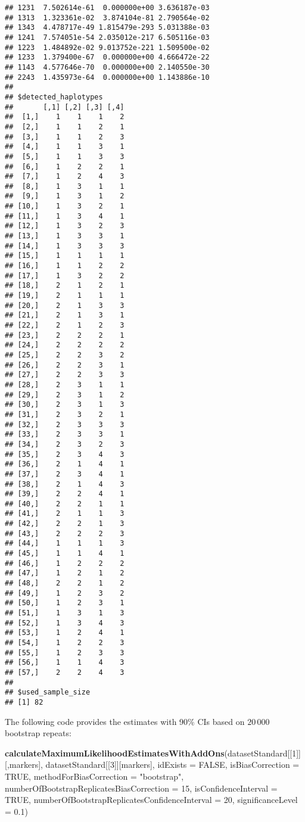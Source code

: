 \documentclass[
]{article}
\newenvironment{Shaded}{\begin{snugshade}}{\end{snugshade}}
\newcommand{\AttributeTok}[1]{\textcolor[rgb]{0.13,0.29,0.53}{#1}}
\newcommand{\ConstantTok}[1]{\textcolor[rgb]{0.56,0.35,0.01}{#1}}
\newcommand{\DecValTok}[1]{\textcolor[rgb]{0.00,0.00,0.81}{#1}}
\newcommand{\FloatTok}[1]{\textcolor[rgb]{0.00,0.00,0.81}{#1}}
\newcommand{\FunctionTok}[1]{\textcolor[rgb]{0.13,0.29,0.53}{\textbf{#1}}}
\newcommand{\NormalTok}[1]{#1}
\newcommand{\StringTok}[1]{\textcolor[rgb]{0.31,0.60,0.02}{#1}}
\begin{document}
\begin{verbatim}
## 1231  7.502614e-61  0.000000e+00 3.636187e-03
## 1313  1.323361e-02  3.874104e-81 2.790564e-02
## 1343  4.478717e-49 1.815479e-293 5.031388e-03
## 1241  7.574051e-54 2.035012e-217 6.505116e-03
## 1223  1.484892e-02 9.013752e-221 1.509500e-02
## 1233  1.379400e-67  0.000000e+00 4.666472e-22
## 1143  4.577646e-70  0.000000e+00 2.140550e-30
## 2243  1.435973e-64  0.000000e+00 1.143886e-10
## 
## $detected_haplotypes
##       [,1] [,2] [,3] [,4]
##  [1,]    1    1    1    2
##  [2,]    1    1    2    1
##  [3,]    1    1    2    3
##  [4,]    1    1    3    1
##  [5,]    1    1    3    3
##  [6,]    1    2    2    1
##  [7,]    1    2    4    3
##  [8,]    1    3    1    1
##  [9,]    1    3    1    2
## [10,]    1    3    2    1
## [11,]    1    3    4    1
## [12,]    1    3    2    3
## [13,]    1    3    3    1
## [14,]    1    3    3    3
## [15,]    1    1    1    1
## [16,]    1    1    2    2
## [17,]    1    3    2    2
## [18,]    2    1    2    1
## [19,]    2    1    1    1
## [20,]    2    1    3    3
## [21,]    2    1    3    1
## [22,]    2    1    2    3
## [23,]    2    2    2    1
## [24,]    2    2    2    2
## [25,]    2    2    3    2
## [26,]    2    2    3    1
## [27,]    2    2    3    3
## [28,]    2    3    1    1
## [29,]    2    3    1    2
## [30,]    2    3    1    3
## [31,]    2    3    2    1
## [32,]    2    3    3    3
## [33,]    2    3    3    1
## [34,]    2    3    2    3
## [35,]    2    3    4    3
## [36,]    2    1    4    1
## [37,]    2    3    4    1
## [38,]    2    1    4    3
## [39,]    2    2    4    1
## [40,]    2    2    1    1
## [41,]    2    1    1    3
## [42,]    2    2    1    3
## [43,]    2    2    2    3
## [44,]    1    1    1    3
## [45,]    1    1    4    1
## [46,]    1    2    2    2
## [47,]    1    2    1    2
## [48,]    2    2    1    2
## [49,]    1    2    3    2
## [50,]    1    2    3    1
## [51,]    1    3    1    3
## [52,]    1    3    4    3
## [53,]    1    2    4    1
## [54,]    1    2    2    3
## [55,]    1    2    3    3
## [56,]    1    1    4    3
## [57,]    2    2    4    3
## 
## $used_sample_size
## [1] 82
\end{verbatim}

The following code provides the estimates with 90\% CIs based on
\(20\,000\) bootstrap repeats:

\begin{Shaded}
\begin{Highlighting}[]
\FunctionTok{calculateMaximumLikelihoodEstimatesWithAddOns}\NormalTok{(datasetStandard[[}\DecValTok{1}\NormalTok{]][,markers], datasetStandard[[}\DecValTok{3}\NormalTok{]][markers], }\AttributeTok{idExists =} \ConstantTok{FALSE}\NormalTok{, }\AttributeTok{isBiasCorrection =} \ConstantTok{TRUE}\NormalTok{, }\AttributeTok{methodForBiasCorrection =} \StringTok{"bootstrap"}\NormalTok{, }\AttributeTok{numberOfBootstrapReplicatesBiasCorrection =} \DecValTok{15}\NormalTok{,  }\AttributeTok{isConfidenceInterval =} \ConstantTok{TRUE}\NormalTok{, }\AttributeTok{numberOfBootstrapReplicatesConfidenceInterval =} \DecValTok{20}\NormalTok{, }\AttributeTok{significanceLevel =} \FloatTok{0.1}\NormalTok{)}
\end{Highlighting}
\end{Shaded}
\end{document}
